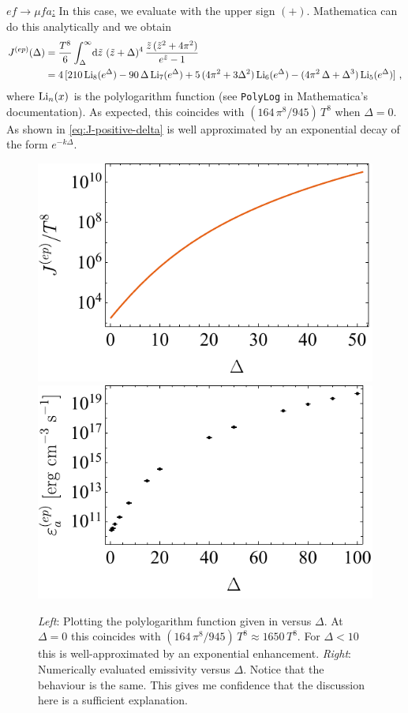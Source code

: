 \underline{$ef \rightarrow \mu f a$:} \vspace{1ex} \newline 
In this case, we evaluate  with the upper sign $(+)$.
Mathematica can do this analytically and we obtain
\begin{equation}
\begin{aligned}
    \label{eq:J-positive-delta}
    J^{(ep)}(\Delta) &= 
    \frac{T^{8}}{6} \int_\Delta^\infty \! \dd \tilde{z} \  (\tilde{z} + \Delta)^{4} \, \frac{\tilde{z} \, (\tilde{z}^2 + 4\pi^2)}{e^{\tilde{z}} - 1} \\
    &= 
    4 \, [
        210 \, \mathrm{Li}_{8}(e^\Delta)
        - 90 \, \Delta \, \mathrm{Li}_{7}(e^\Delta)
        + 5 \, (4\pi^2 + 3 \Delta^2) \, \mathrm{Li}_{6}(e^\Delta)
        - (4\pi^2 \, \Delta + \Delta^3) \, \mathrm{Li}_{5}(e^\Delta)
    ]
    ~,
\end{aligned}
\end{equation}
where $\mathrm{Li}_{n}(x)$ is the polylogarithm function (see \texttt{PolyLog} in Mathematica's documentation).
As expected, this coincides with $(164 \, \pi^8 / 945) \, T^8$ when $\Delta = 0$.
As shown in  \eqref{eq:J-positive-delta} is well approximated by an exponential decay of the form $e^{-k \Delta}$.  
\begin{figure}[htbp]
    \centering
    \includegraphics[width=0.45\linewidth]{figs/polylogarithm.pdf}
    \includegraphics[width=0.45\linewidth]{figs/epdata.pdf}
    \caption{
        \emph{Left}:
        Plotting the polylogarithm function given in  versus $\Delta$.
        At $\Delta=0$ this coincides with $(164 \, \pi^8 / 945) \, T^8 \approx 1650 \, T^8$. For $\Delta < 10$ this is well-approximated by an exponential enhancement.
        \emph{Right}: 
        Numerically evaluated emissivity versus $\Delta$.
        Notice that the behaviour is the same. This gives me confidence that the discussion here is a sufficient explanation.
    }
    \label{fig:positive-delta}
\end{figure}

